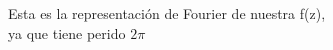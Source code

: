 \documentclass[preview]{standalone}
\begin{document}
\begin{center}
Esta es la representación de Fourier de nuestra f(z),\\ ya que tiene perido $2\pi$
\end{center}
\end{document}
